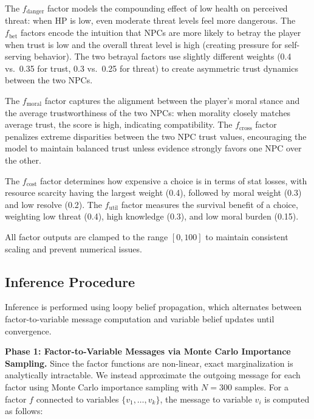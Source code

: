 \documentclass[journal]{IEEEtran}
\begin{document}
The $f_{\text{danger}}$ factor models the compounding effect of low health on perceived threat: when HP is low, even moderate threat levels feel more dangerous. The $f_{\text{bet}}$ factors encode the intuition that NPCs are more likely to betray the player when trust is low and the overall threat level is high (creating pressure for self-serving behavior). The two betrayal factors use slightly different weights (0.4 vs.\ 0.35 for trust, 0.3 vs.\ 0.25 for threat) to create asymmetric trust dynamics between the two NPCs.

The $f_{\text{moral}}$ factor captures the alignment between the player's moral stance and the average trustworthiness of the two NPCs: when morality closely matches average trust, the score is high, indicating compatibility. The $f_{\text{cross}}$ factor penalizes extreme disparities between the two NPC trust values, encouraging the model to maintain balanced trust unless evidence strongly favors one NPC over the other.

The $f_{\text{cost}}$ factor determines how expensive a choice is in terms of stat losses, with resource scarcity having the largest weight (0.4), followed by moral weight (0.3) and low resolve (0.2). The $f_{\text{util}}$ factor measures the survival benefit of a choice, weighting low threat (0.4), high knowledge (0.3), and low moral burden (0.15).

All factor outputs are clamped to the range $[0, 100]$ to maintain consistent scaling and prevent numerical issues.

\subsection{Inference Procedure}

Inference is performed using loopy belief propagation, which alternates between factor-to-variable message computation and variable belief updates until convergence.

\textbf{Phase 1: Factor-to-Variable Messages via Monte Carlo Importance Sampling.} Since the factor functions are non-linear, exact marginalization is analytically intractable. We instead approximate the outgoing message for each factor using Monte Carlo importance sampling with $N = 300$ samples. For a factor $f$ connected to variables $\{v_1, \ldots, v_k\}$, the message to variable $v_i$ is computed as follows:
\end{document}
